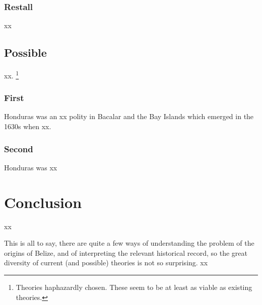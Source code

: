 		\subsubsection{Restall}
		xx
	\subsection{Possible}
	\label{ss:possible}
		xx.%
		\footnote{Theories haphazardly chosen. These seem to be at least as viable as existing theories.} %
		
		\subsubsection{First}
		Honduras was an xx polity in Bacalar and the Bay Islands which emerged in the 1630s when xx.
		
		\subsubsection{Second}
		Honduras was xx
%
%
%
\section{Conclusion}
\label{s:concl}
	xx
	
	This is all to say, there are quite a few ways of understanding the problem of the origins of Belize, and of interpreting the relevant historical record, so the great diversity of current (and possible) theories is not so surprising. xx
%
%
%
